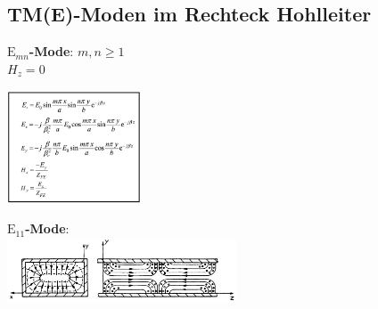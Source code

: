 \documentclass[english]{latex4ei/latex4ei_sheet}
\begin{document}
\begin{sectionbox}
    \subsection{TM(E)-Moden im Rechteck Hohlleiter}
    \textbf{$\text{E}_{mn}$-Mode}: $m,n \geq 1$\\
    $H_z = 0$
    \begin{center}\includegraphics[width = 4cm]{./img/Emn.png}\end{center}

    \textbf{$\text{E}_{11}$-Mode}:\\
    \includegraphics[width = 6.8cm]{./img/E11-bild1.png}
\end{sectionbox}
\end{document}

